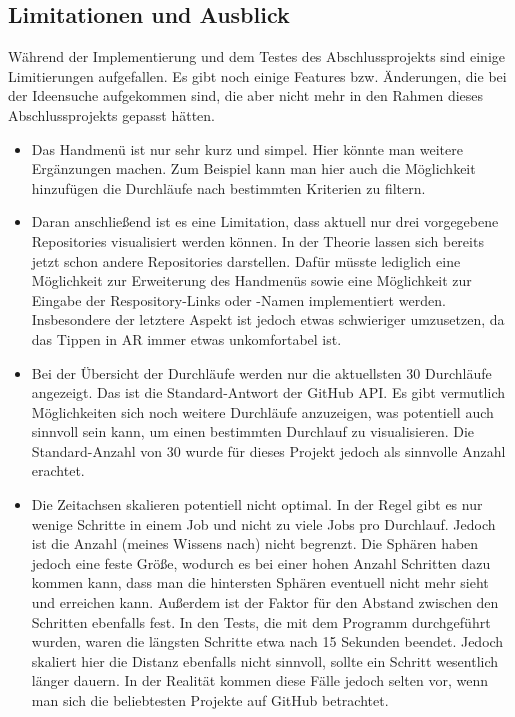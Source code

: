\documentclass[a4paper]{article}
\begin{document}
\subsection{Limitationen und Ausblick}
Während der Implementierung und dem Testes des Abschlussprojekts sind einige Limitierungen aufgefallen. Es gibt noch einige Features bzw. Änderungen, die bei der Ideensuche aufgekommen sind, die aber nicht mehr in den Rahmen dieses Abschlussprojekts gepasst hätten.
\begin{itemize}
    \item Das Handmenü ist nur sehr kurz und simpel. Hier könnte man weitere Ergänzungen machen. Zum Beispiel kann man hier auch die Möglichkeit hinzufügen die Durchläufe nach bestimmten Kriterien zu filtern.
    \item Daran anschließend ist es eine Limitation, dass aktuell nur drei vorgegebene Repositories visualisiert werden können. In der Theorie lassen sich bereits jetzt schon andere Repositories darstellen. Dafür müsste lediglich eine Möglichkeit zur Erweiterung des Handmenüs sowie eine Möglichkeit zur Eingabe der Respository-Links oder -Namen implementiert werden. Insbesondere der letztere Aspekt ist jedoch etwas schwieriger umzusetzen, da das Tippen in AR immer etwas unkomfortabel ist.
    \item Bei der Übersicht der Durchläufe werden nur die aktuellsten 30 Durchläufe angezeigt. Das ist die Standard-Antwort der GitHub API. Es gibt vermutlich Möglichkeiten sich noch weitere Durchläufe anzuzeigen, was potentiell auch sinnvoll sein kann, um einen bestimmten Durchlauf zu visualisieren. Die Standard-Anzahl von 30 wurde für dieses Projekt jedoch als sinnvolle Anzahl erachtet.
    \item Die Zeitachsen skalieren potentiell nicht optimal. In der Regel gibt es nur wenige Schritte in einem Job und nicht zu viele Jobs pro Durchlauf. Jedoch ist die Anzahl (meines Wissens nach) nicht begrenzt. Die Sphären haben jedoch eine feste Größe, wodurch es bei einer hohen Anzahl Schritten dazu kommen kann, dass man die hintersten Sphären eventuell nicht mehr sieht und erreichen kann. Außerdem ist der Faktor für den Abstand zwischen den Schritten ebenfalls fest. In den Tests, die mit dem Programm durchgeführt wurden, waren die längsten Schritte etwa nach 15 Sekunden beendet. Jedoch skaliert hier die Distanz ebenfalls nicht sinnvoll, sollte ein Schritt wesentlich länger dauern. In der Realität kommen diese Fälle jedoch selten vor, wenn man sich die beliebtesten Projekte auf GitHub betrachtet. 
\end{itemize}
\end{document}
